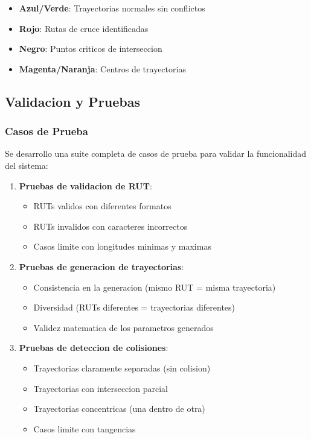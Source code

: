 \documentclass[12pt,a4paper]{article}
\begin{document}
\begin{itemize}
    \item \textbf{Azul/Verde}: Trayectorias normales sin conflictos
    \item \textbf{Rojo}: Rutas de cruce identificadas
    \item \textbf{Negro}: Puntos criticos de interseccion
    \item \textbf{Magenta/Naranja}: Centros de trayectorias
\end{itemize}

\subsection{Validacion y Pruebas}

\subsubsection{Casos de Prueba}

Se desarrollo una suite completa de casos de prueba para validar la funcionalidad del sistema:

\begin{enumerate}
    \item \textbf{Pruebas de validacion de RUT}:
    \begin{itemize}
        \item RUTs validos con diferentes formatos
        \item RUTs invalidos con caracteres incorrectos
        \item Casos limite con longitudes minimas y maximas
    \end{itemize}
    
    \item \textbf{Pruebas de generacion de trayectorias}:
    \begin{itemize}
        \item Consistencia en la generacion (mismo RUT = misma trayectoria)
        \item Diversidad (RUTs diferentes = trayectorias diferentes)
        \item Validez matematica de los parametros generados
    \end{itemize}
    
    \item \textbf{Pruebas de deteccion de colisiones}:
    \begin{itemize}
        \item Trayectorias claramente separadas (sin colision)
        \item Trayectorias con interseccion parcial
        \item Trayectorias concentricas (una dentro de otra)
        \item Casos limite con tangencias
    \end{itemize}
\end{enumerate}
\end{document}
